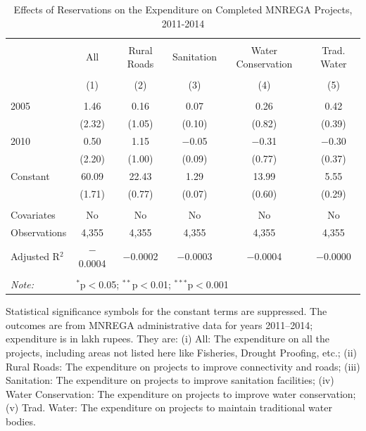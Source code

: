 \begin{table}[!htbp]
\centering
\begin{threeparttable}

  \caption{Effects of Reservations on the Expenditure on Completed MNREGA Projects, 2011-2014} 
  \label{main_mnrega_expenditure} 
\scriptsize 
\begin{tabular}{@{\extracolsep{0pt}}lccccc} 
\\[-1.8ex]\hline 
\hline \\[-1.8ex] 
 & All & Rural Roads & Sanitation & Water Conservation & Trad. Water \\ 
\\[-1.8ex] & (1) & (2) & (3) & (4) & (5)\\ 
\hline \\[-1.8ex] 
 2005 & 1.46 & 0.16 & 0.07 & 0.26 & 0.42 \\ 
  & (2.32) & (1.05) & (0.10) & (0.82) & (0.39) \\ 
  2010 & 0.50 & 1.15 & $-$0.05 & $-$0.31 & $-$0.30 \\ 
  & (2.20) & (1.00) & (0.09) & (0.77) & (0.37) \\ 
  Constant & 60.09 & 22.43 & 1.29 & 13.99 & 5.55 \\ 
  & (1.71) & (0.77) & (0.07) & (0.60) & (0.29) \\ 
 \hline \\[-1.8ex] 
Covariates & No & No & No & No & No \\ 
Observations & 4,355 & 4,355 & 4,355 & 4,355 & 4,355 \\ 
Adjusted R$^{2}$ & $-$0.0004 & $-$0.0002 & $-$0.0003 & $-$0.0004 & $-$0.0000 \\ 
\hline 
\hline \\[-1.8ex] 
\textit{Note:}  & \multicolumn{5}{l}{$^{*}$p$<$0.05; $^{**}$p$<$0.01; $^{***}$p$<$0.001} \\ 
\end{tabular} 
\begin{tablenotes}[flushleft]
\scriptsize
\item[] Statistical significance symbols for the constant terms are suppressed. The outcomes are from MNREGA administrative data for years 2011--2014; expenditure is in lakh rupees. They are: 
                     (i) All: The expenditure on all the projects, including areas not listed here like Fisheries, Drought Proofing, etc.;
                     (ii) Rural Roads: The expenditure on projects to improve connectivity and roads;
                     (iii) Sanitation: The expenditure on projects to improve sanitation facilities;
                     (iv) Water Conservation: The expenditure on projects to improve water conservation;
                     (v) Trad. Water: The expenditure on projects to maintain traditional water bodies.
\end{tablenotes}
\end{threeparttable}
\end{table}
